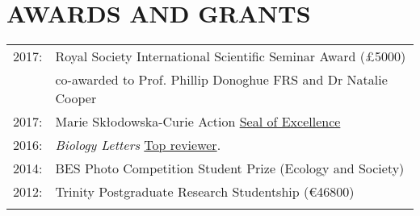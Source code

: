 \documentclass[10pt,a4paper]{article}
\begin{document}
{%




\bigskip




\section{AWARDS AND GRANTS}
\begin{tabular}{ll}
2017: & Royal Society International Scientific Seminar Award (\pounds5000)\\
      & co-awarded to Prof. Phillip Donoghue FRS and Dr Natalie Cooper\\
2017: & Marie Sk\l{}odowska-Curie Action \href{https://ec.europa.eu/research/soe/index.cfm?pg=what}{Seal of Excellence}\\
2016: & \textit{Biology Letters} \href{http://blogs.royalsociety.org/publishing/biology-letters-top-reviewers-from-2016/}{Top reviewer}.\\
2014: & BES Photo Competition Student Prize (Ecology and Society)\\
2012: & Trinity Postgraduate Research Studentship (\euro46800)\\
& \\ 
\end{tabular}
\bigskip

}
\end{document}
